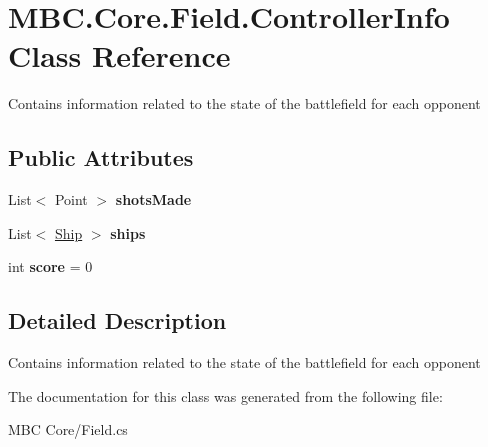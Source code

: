 \hypertarget{class_m_b_c_1_1_core_1_1_field_1_1_controller_info}{\section{M\-B\-C.\-Core.\-Field.\-Controller\-Info Class Reference}
\label{class_m_b_c_1_1_core_1_1_field_1_1_controller_info}
}


Contains information related to the state of the battlefield for each opponent 


\subsection*{Public Attributes}
\begin{DoxyCompactItemize}
\item 
\hypertarget{class_m_b_c_1_1_core_1_1_field_1_1_controller_info_a0e47d7ccd7030340d6b8cb7691bd3d93}{List$<$ Point $>$ {\bfseries shots\-Made}}\label{class_m_b_c_1_1_core_1_1_field_1_1_controller_info_a0e47d7ccd7030340d6b8cb7691bd3d93}

\item 
\hypertarget{class_m_b_c_1_1_core_1_1_field_1_1_controller_info_a6d69c3ee13b7f5779921afc37582d5e1}{List$<$ \hyperlink{class_m_b_c_1_1_core_1_1_ship}{Ship} $>$ {\bfseries ships}}\label{class_m_b_c_1_1_core_1_1_field_1_1_controller_info_a6d69c3ee13b7f5779921afc37582d5e1}

\item 
\hypertarget{class_m_b_c_1_1_core_1_1_field_1_1_controller_info_a04bdad238fa4cc5793a332019760d69f}{int {\bfseries score} = 0}\label{class_m_b_c_1_1_core_1_1_field_1_1_controller_info_a04bdad238fa4cc5793a332019760d69f}

\end{DoxyCompactItemize}


\subsection{Detailed Description}
Contains information related to the state of the battlefield for each opponent

The documentation for this class was generated from the following file\-:\begin{DoxyCompactItemize}
\item 
M\-B\-C Core/Field.\-cs\end{DoxyCompactItemize}
